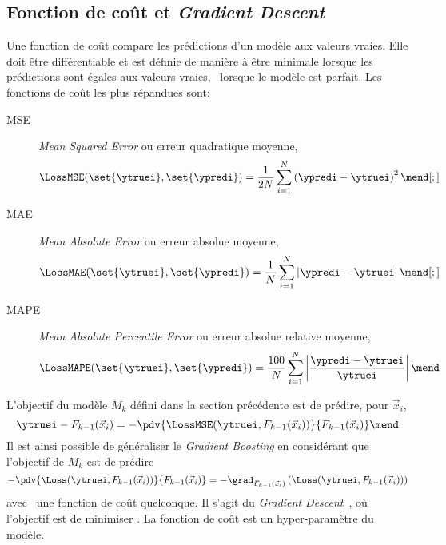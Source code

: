 \subsection{Fonction de coût et \emph{Gradient Descent}}\label{chapter-ML-section-loss}
Une fonction de coût compare les prédictions d'un modèle aux valeurs vraies.
Elle doit être différentiable et est définie de manière à être minimale lorsque les prédictions sont égales aux valeurs vraies, \ie\ lorsque le modèle est parfait.
Les fonctions de coût les plus répandues sont:
\begin{description}
\item[MSE] \emph{Mean Squared Error} ou erreur quadratique moyenne,
\begin{equation}
\LossMSE(\set{\ytruei}, \set{\ypredi}) = \frac{1}{2N} \sum_{i=1}^N \left( \ypredi - \ytruei \right)^2
\label{eq-loss_MSE}
\mend[;]
\end{equation}
\item[MAE] \emph{Mean Absolute Error} ou erreur absolue moyenne,
\begin{equation}
\LossMAE(\set{\ytruei}, \set{\ypredi}) = \frac{1}{N} \sum_{i=1}^N \left| \ypredi - \ytruei \right|
\label{eq-loss_MAE}
\mend[;]
\end{equation}
\item[MAPE] \emph{Mean Absolute Percentile Error} ou erreur absolue relative moyenne,
\begin{equation}
\LossMAPE(\set{\ytruei}, \set{\ypredi}) = \frac{100}{N} \sum_{i=1}^N \left| \frac{\ypredi - \ytruei}{\ytruei} \right|
\label{eq-loss_MAPE}
\mend
\end{equation}
\end{description}
\par
L'objectif du modèle $M_k$ défini dans la section précédente est de prédire, pour $\vec{x}_i$,
\begin{equation}
\ytruei - F_{k-1}(\vec{x}_i)
=
- \pdv{\LossMSE(\ytruei, F_{k-1}(\vec{x}_i))}{F_{k-1}(\vec{x}_i)}
\mend
\end{equation}
Il est ainsi possible de généraliser le \emph{Gradient Boosting}
en considérant que l'objectif de $M_k$ est de prédire
\begin{equation}
- \pdv{\Loss(\ytruei, F_{k-1}(\vec{x}_i))}{F_{k-1}(\vec{x}_i)}
=
- \grad_{F_{k-1}(\vec{x}_i)} \left(\Loss(\ytruei, F_{k-1}(\vec{x}_i))\right)
\end{equation}
avec \Loss\ une fonction de coût quelconque.
Il s'agit du \emph{Gradient Descent}~\cite{cauchy_1847},
où l'objectif est de minimiser \Loss.
La fonction de coût est un hyper-paramètre du modèle.
